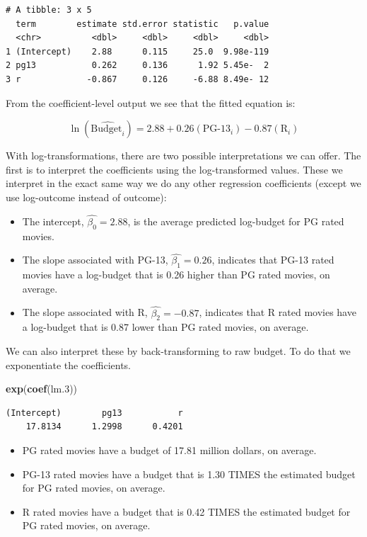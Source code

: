 \documentclass[]{book}
\newenvironment{Shaded}{\begin{snugshade}}{\end{snugshade}}
\newcommand{\FloatTok}[1]{\textcolor[rgb]{0.00,0.00,0.81}{#1}}
\newcommand{\KeywordTok}[1]{\textcolor[rgb]{0.13,0.29,0.53}{\textbf{#1}}}
\newcommand{\NormalTok}[1]{#1}
\providecommand{\tightlist}{%
  \setlength{\itemsep}{0pt}\setlength{\parskip}{0pt}}
\begin{document}
\begin{verbatim}
# A tibble: 3 x 5
  term        estimate std.error statistic   p.value
  <chr>          <dbl>     <dbl>     <dbl>     <dbl>
1 (Intercept)    2.88      0.115     25.0  9.98e-119
2 pg13           0.262     0.136      1.92 5.45e-  2
3 r             -0.867     0.126     -6.88 8.49e- 12
\end{verbatim}

From the coefficient-level output we see that the fitted equation is:

\[
\ln\left(\hat{\mathrm{Budget}_i}\right) = 2.88 + 0.26(\mathrm{PG\mbox{-}13}_i) - 0.87(\mathrm{R}_i)
\]

With log-transformations, there are two possible interpretations we can offer. The first is to interpret the coefficients using the log-transformed values. These we interpret in the exact same way we do any other regression coefficients (except we use log-outcome instead of outcome):

\begin{itemize}
\tightlist
\item
  The intercept, \(\hat{\beta_0} = 2.88\), is the average predicted log-budget for PG rated movies.
\item
  The slope associated with PG-13, \(\hat{\beta_1} = 0.26\), indicates that PG-13 rated movies have a log-budget that is 0.26 higher than PG rated movies, on average.
\item
  The slope associated with R, \(\hat{\beta_2} = -0.87\), indicates that R rated movies have a log-budget that is 0.87 lower than PG rated movies, on average.
\end{itemize}

We can also interpret these by back-transforming to raw budget. To do that we exponentiate the coefficients.

\begin{Shaded}
\begin{Highlighting}[]
\KeywordTok{exp}\NormalTok{(}\KeywordTok{coef}\NormalTok{(lm}\FloatTok{.3}\NormalTok{))}
\end{Highlighting}
\end{Shaded}

\begin{verbatim}
(Intercept)        pg13           r 
    17.8134      1.2998      0.4201 
\end{verbatim}

\begin{itemize}
\tightlist
\item
  PG rated movies have a budget of 17.81 million dollars, on average.
\item
  PG-13 rated movies have a budget that is 1.30 TIMES the estimated budget for PG rated movies, on average.
\item
  R rated movies have a budget that is 0.42 TIMES the estimated budget for PG rated movies, on average.
\end{itemize}
\end{document}
